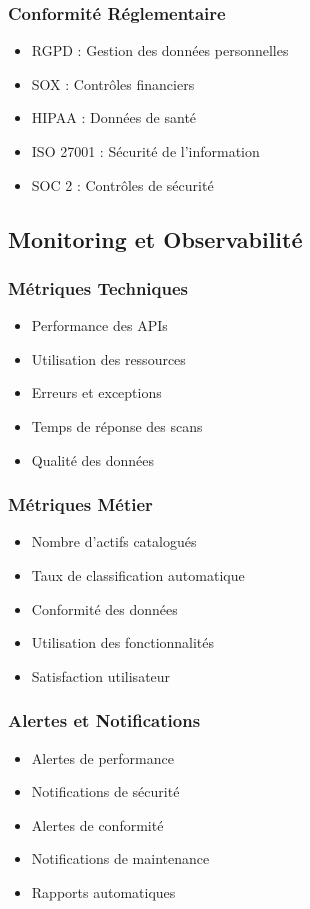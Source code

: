 \documentclass[12pt,a4paper]{article}
\begin{document}
\subsubsection{Conformité Réglementaire}
\begin{itemize}
    \item RGPD : Gestion des données personnelles
    \item SOX : Contrôles financiers
    \item HIPAA : Données de santé
    \item ISO 27001 : Sécurité de l'information
    \item SOC 2 : Contrôles de sécurité
\end{itemize}

\subsection{Monitoring et Observabilité}

\subsubsection{Métriques Techniques}
\begin{itemize}
    \item Performance des APIs
    \item Utilisation des ressources
    \item Erreurs et exceptions
    \item Temps de réponse des scans
    \item Qualité des données
\end{itemize}

\subsubsection{Métriques Métier}
\begin{itemize}
    \item Nombre d'actifs catalogués
    \item Taux de classification automatique
    \item Conformité des données
    \item Utilisation des fonctionnalités
    \item Satisfaction utilisateur
\end{itemize}

\subsubsection{Alertes et Notifications}
\begin{itemize}
    \item Alertes de performance
    \item Notifications de sécurité
    \item Alertes de conformité
    \item Notifications de maintenance
    \item Rapports automatiques
\end{itemize}
\end{document}
